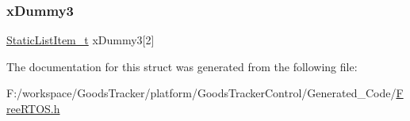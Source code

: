 \mbox{\label{structx_s_t_a_t_i_c___t_c_b_acbd968fbd6059e44009bb84bbc25cb1d}} 
\subsubsection{\texorpdfstring{x\+Dummy3}{xDummy3}}
{\footnotesize\ttfamily \hyperlink{_free_r_t_o_s_8h_a1d31bc0472385a87424518da484d9e09}{Static\+List\+Item\+\_\+t} x\+Dummy3\mbox{[}2\mbox{]}}



The documentation for this struct was generated from the following file\+:\begin{DoxyCompactItemize}
\item 
F\+:/workspace/\+Goods\+Tracker/platform/\+Goods\+Tracker\+Control/\+Generated\+\_\+\+Code/\hyperlink{_free_r_t_o_s_8h}{Free\+R\+T\+O\+S.\+h}\end{DoxyCompactItemize}
